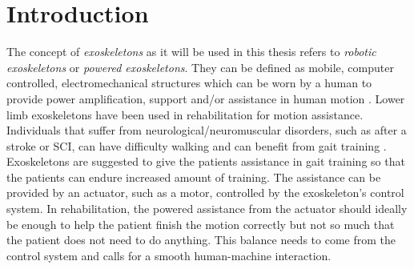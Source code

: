 \documentclass[../main.tex]{subfiles}
\begin{document}
\chapter{Introduction}
The concept of \textit{exoskeletons} as it will be used in this thesis refers to \textit{robotic exoskeletons} or \textit{powered exoskeletons}. 
They can be defined as mobile, computer controlled, electromechanical structures which can be worn by a human to provide power amplification, support and/or assistance in human motion \cite{Anam2012, Gorgey2018}. 
Lower limb exoskeletons have been used in rehabilitation for motion assistance.
Individuals that suffer from neurological/neuromuscular disorders, such as after a stroke or \ac{SCI}, can have difficulty walking and can benefit from gait training \cite{Gorgey2018, Young2017, Lerner2017}.
Exoskeletons are suggested to give the patients assistance in gait training so that the patients can endure increased amount of training.
The assistance can be provided by an actuator, such as a motor, controlled by the exoskeleton's control system.
In rehabilitation, the powered assistance from the actuator should ideally be enough to help the patient finish the motion correctly but not so much that the patient does not need to do anything.
This balance needs to come from the control system and calls for a smooth human-machine interaction.
\end{document}
